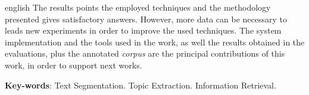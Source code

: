 \begin{resumo}[Abstract]
\begin{otherlanguage*}{english}
The results points the employed techniques and the methodology presented gives satisfactory answers. However, more data can be necessary to leads new experiments in order to improve the used techniques.  
The system implementation and the tools used in the work, as well the results obtained in the evaluations, plus the annotated \textit{corpus} are the principal contributions of this work, in order to support next works.










\textbf{Key-words}: 
Text Segmentation.
Topic Extraction.
Information Retrieval.

 \end{otherlanguage*}
\end{resumo}

